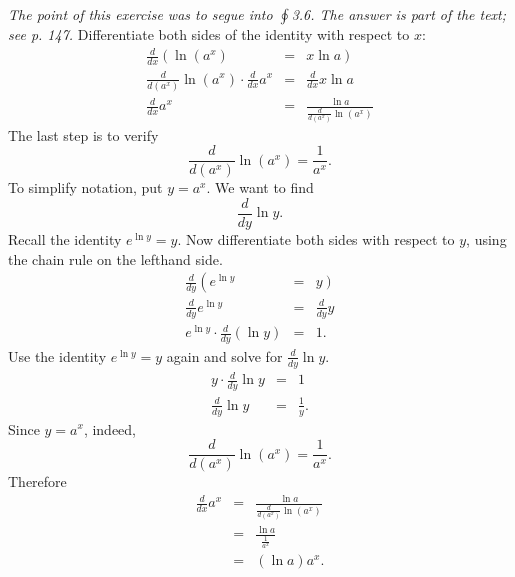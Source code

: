 \documentclass[11pt,letterpaper]{article}
\begin{document}
\vspace{.5pc}\textit{The point of this exercise was to segue into $\oint $3.6.  The answer is part of the text; see p. 147.}
\linebreak
Differentiate both sides of the identity with respect to $x$:
\begin{eqnarray*}
\frac{d}{dx}\left(\ln{(a^x)}\right. &=& \left.x\ln{a}\right) \\
\frac{d}{d(a^x)}\ln{(a^x)}\cdot \frac{d}{dx}a^x &=& \frac{d}{dx}x\ln{a} \\
\frac{d}{dx}a^x &=& \frac{\ln{a}}{\frac{d}{d(a^x)}\ln{(a^x)}}
\end{eqnarray*}
The last step is to verify 
\[\frac{d}{d(a^x)}\ln{(a^x)}=\frac{1}{a^x}.\]
To simplify notation, put $y=a^x$.  We want to find
\[\frac{d}{dy}\ln{y}.\]
Recall the identity $e^{\ln{y}}=y$.  Now differentiate both sides with respect to $y$, using the chain rule on the lefthand side.
\begin{eqnarray*}
\frac{d}{dy}\left(e^{\ln{y}}\right. &=& \left.y\right) \\
\frac{d}{dy}e^{\ln{y}} &=& \frac{d}{dy}y \\
e^{\ln{y}}\cdot \frac{d}{dy}(\ln{y}) &=& 1.
\end{eqnarray*}
Use the identity $e^{\ln{y}}=y$ again and solve for $\frac{d}{dy}\ln{y}$.
\begin{eqnarray*}
y\cdot \frac{d}{dy}\ln{y} &=& 1 \\
\frac{d}{dy}\ln{y} &=& \frac{1}{y}.
\end{eqnarray*}
Since $y=a^x$, indeed,
\[\frac{d}{d(a^x)}\ln{(a^x)}=\frac{1}{a^x}.\]
Therefore 
\begin{eqnarray*}
\frac{d}{dx}a^x &=& \frac{\ln{a}}{\frac{d}{d(a^x)}\ln{(a^x)}} \\
&=& \frac{\ln{a}}{\frac{1}{a^x}} \\
&=& (\ln{a})a^x. 
\end{eqnarray*}
\end{document}

